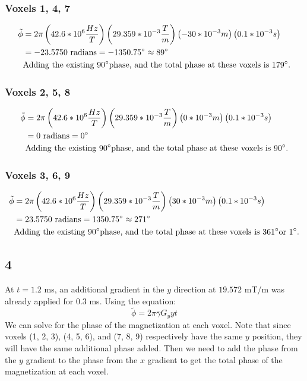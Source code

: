 \documentclass{article}
\begin{document}
\subsubsection*{Voxels 1, 4, 7}
\begin{align*}
    \tilde{\phi} &= 
    2\pi \left(42.6 * 10^{6} \frac{Hz}{T}\right)
    \left(29.359 * 10^{-3} \frac{T}{m} \right)
    \left(-30 * 10^{-3} m \right)
    \left(0.1 * 10^{-3} s \right) \\
    &= -23.5750 \textrm{ radians} = -1350.75\degree \approx 89\degree \\
    &\textrm{Adding the existing 90\degree phase, and the total phase at these voxels is 179\degree.}
\end{align*}
\subsubsection*{Voxels 2, 5, 8}
\begin{align*}
    \tilde{\phi} &= 
    2\pi \left(42.6 * 10^{6} \frac{Hz}{T}\right)
    \left(29.359 * 10^{-3} \frac{T}{m} \right)
    \left(0 * 10^{-3} m \right)
    \left(0.1 * 10^{-3} s \right) \\
    &= 0 \textrm{ radians} = 0\degree \\
    &\textrm{Adding the existing 90\degree phase, and the total phase at these voxels is 90\degree.}
\end{align*}
\subsubsection*{Voxels 3, 6, 9}
\begin{align*}
    \tilde{\phi} &= 
    2\pi \left(42.6 * 10^{6} \frac{Hz}{T}\right)
    \left(29.359 * 10^{-3} \frac{T}{m} \right)
    \left(30 * 10^{-3} m \right)
    \left(0.1 * 10^{-3} s \right) \\
    &= 23.5750 \textrm{ radians} = 1350.75\degree \approx 271\degree \\
    &\textrm{Adding the existing 90\degree phase, and the total phase at these voxels is 361\degree or 1\degree.}
\end{align*}

\subsection*{4}
At $t = 1.2$ ms, an additional gradient in the $y$ direction at $19.572$ mT/m was already applied for $0.3$ ms. Using
the equation: \[ \tilde{\phi} = 2\pi \bar{\gamma}G_{y}yt \]
We can solve for the phase of the magnetization at each voxel. Note that since
voxels (1, 2, 3), (4, 5, 6), and (7, 8, 9) respectively have the
same $y$ position, they will have the same additional phase added. Then we need to add the
phase from the $y$ gradient to the phase from the $x$ gradient to get the total
phase of the magnetization at each voxel.
\end{document}
